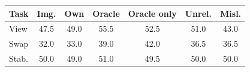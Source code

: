 \begin{tabular}{lcccccc}
\toprule
Task & Img. & Own & Oracle & Oracle only & Unrel. & Misl. \\
\midrule
View & 47.5 & 49.0 & 55.5 & 52.5 & 51.0 & 43.0 \\
Swap & 32.0 & 33.0 & 39.0 & 42.0 & 36.5 & 36.5 \\
Stab. & 50.0 & 49.0 & 51.0 & 49.5 & 50.0 & 50.0 \\
\bottomrule
\end{tabular}
